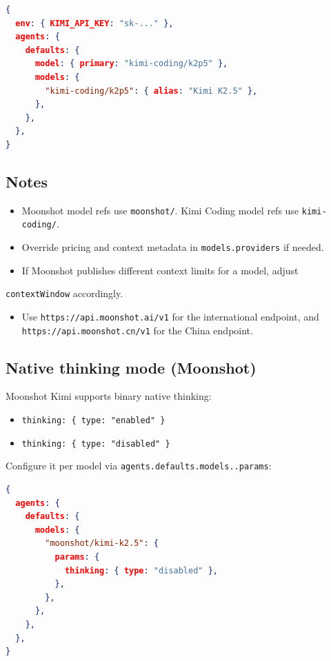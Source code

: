 \begin{lstlisting}[language=json]
{
  env: { KIMI_API_KEY: "sk-..." },
  agents: {
    defaults: {
      model: { primary: "kimi-coding/k2p5" },
      models: {
        "kimi-coding/k2p5": { alias: "Kimi K2.5" },
      },
    },
  },
}
\end{lstlisting}


\subsection{Notes}


\begin{itemize}
  \item Moonshot model refs use \texttt{moonshot/}. Kimi Coding model refs use \texttt{kimi-coding/}.
  \item Override pricing and context metadata in \texttt{models.providers} if needed.
  \item If Moonshot publishes different context limits for a model, adjust
\end{itemize}

\texttt{contextWindow} accordingly.
\begin{itemize}
  \item Use \texttt{https://api.moonshot.ai/v1} for the international endpoint, and \texttt{https://api.moonshot.cn/v1} for the China endpoint.
\end{itemize}


\subsection{Native thinking mode (Moonshot)}


Moonshot Kimi supports binary native thinking:

\begin{itemize}
  \item \texttt{thinking: \{ type: "enabled" \}}
  \item \texttt{thinking: \{ type: "disabled" \}}
\end{itemize}


Configure it per model via \texttt{agents.defaults.models..params}:

\begin{lstlisting}[language=json]
{
  agents: {
    defaults: {
      models: {
        "moonshot/kimi-k2.5": {
          params: {
            thinking: { type: "disabled" },
          },
        },
      },
    },
  },
}
\end{lstlisting}


